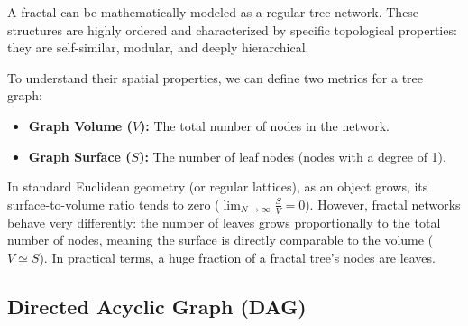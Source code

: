 \begin{example}
    A fractal can be mathematically modeled as a regular tree network. These structures are highly ordered and characterized by specific topological properties: they are self-similar, modular, and deeply hierarchical.

    To understand their spatial properties, we can define two metrics for a tree graph:
    \begin{itemize}
        \item \textbf{Graph Volume ($V$):} The total number of nodes in the network.
        \item \textbf{Graph Surface ($S$):} The number of leaf nodes (nodes with a degree of 1).
    \end{itemize}
    In standard Euclidean geometry (or regular lattices), as an object grows, its surface-to-volume ratio tends to zero ($\lim_{N\to\infty} \frac{S}{V} = 0$). However, fractal networks behave very differently: the number of leaves grows proportionally to the total number of nodes, meaning the surface is directly comparable to the volume ($V \simeq S$). In practical terms, a huge fraction of a fractal tree's nodes are leaves.
\end{example}

\subsection{Directed Acyclic Graph (DAG)}

